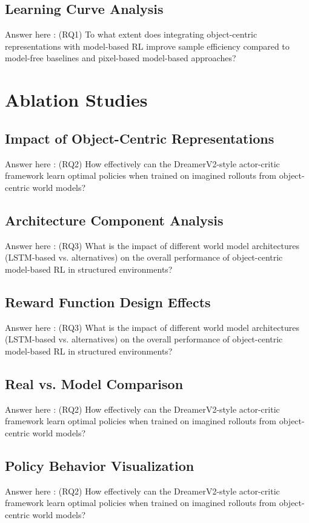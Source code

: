 \documentclass[
	english,
	ruledheaders=section,
	class=report,
	thesis={type=master},
	accentcolor=9c,
	custommargins=true,
	marginpar=false,
	parskip=half-,
	fontsize=11pt,
]{tudapub}
\begin{document}
\subsection{Learning Curve Analysis}
\label{subsec:learning_curves}
Answer here : (RQ1) To what extent does integrating object-centric representations with model-based RL improve sample efficiency compared to model-free baselines and pixel-based model-based approaches?


\section{Ablation Studies}
\label{sec:ablation_studies}

\subsection{Impact of Object-Centric Representations}
\label{subsec:oc_impact}
Answer here : (RQ2) How effectively can the DreamerV2-style actor-critic framework learn optimal policies when trained on imagined rollouts from object-centric world models?


\subsection{Architecture Component Analysis}
\label{subsec:architecture_analysis}
Answer here : (RQ3) What is the impact of different world model architectures (LSTM-based vs. alternatives) on the overall performance of object-centric model-based RL in structured environments?


\subsection{Reward Function Design Effects}
\label{subsec:reward_effects}
Answer here : (RQ3) What is the impact of different world model architectures (LSTM-based vs. alternatives) on the overall performance of object-centric model-based RL in structured environments?


\subsection{Real vs. Model Comparison}
\label{subsec:real_vs_model}
Answer here : (RQ2) How effectively can the DreamerV2-style actor-critic framework learn optimal policies when trained on imagined rollouts from object-centric world models?


\subsection{Policy Behavior Visualization}
\label{subsec:policy_visualization}
Answer here : (RQ2) How effectively can the DreamerV2-style actor-critic framework learn optimal policies when trained on imagined rollouts from object-centric world models?
\end{document}
